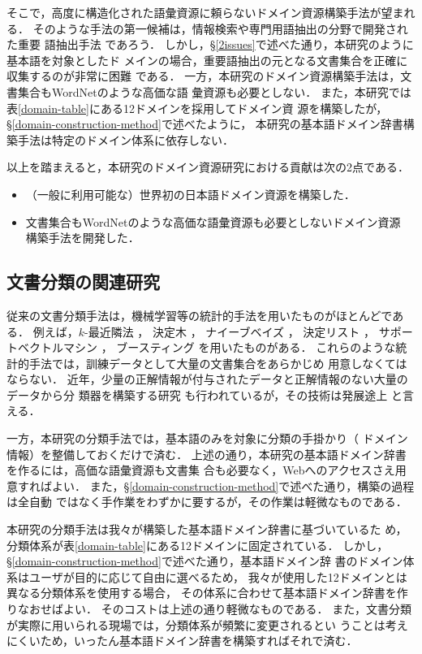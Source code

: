 \documentclass[japanese]{jnlp_1.4}
\begin{document}
そこで，高度に構造化された語彙資源に頼らないドメイン資源構築手法が望まれ
る．
そのような手法の第一候補は，情報検索や専門用語抽出の分野で開発された重要
語抽出手法
\cite{Frantzi:Ananiadou:Tsujii:1998,Hisamitsu:Tsujii:2003,中川:森:湯本:2003}
であろう．
しかし，\S\ref{2issues}で述べた通り，本研究のように基本語を対象としたド
メインの場合，重要語抽出の元となる文書集合を正確に収集するのが非常に困難
である．
一方，本研究のドメイン資源構築手法は，文書集合もWordNetのような高価な語
彙資源も必要としない．
また，本研究では表\ref{domain-table}にある12ドメインを採用してドメイン資
源を構築したが，\S\ref{domain-construction-method}で述べたように，
本研究の基本語ドメイン辞書構築手法は特定のドメイン体系に依存しない．

以上を踏まえると，本研究のドメイン資源研究における貢献は次の2点である．

\begin{itemize}
 \item （一般に利用可能な）世界初の日本語ドメイン資源を構築した．
 \item 文書集合もWordNetのような高価な語彙資源も必要としないドメイン資源
       構築手法を開発した．
\end{itemize}


\subsection{文書分類の関連研究}

従来の文書分類手法は，機械学習等の統計的手法を用いたものがほとんどである．
例えば，$k$-最近隣法 \cite{yang99evaluation}，
決定木 \cite{lewis94comparison}，
ナイーブベイズ \cite{lewis98naive}，
決定リスト \cite{li99text}，
サポートベクトルマシン \cite{平:春野:2000}，
ブースティング \cite{schapire00boostexter}を用いたものがある．
これらのような統計的手法では，訓練データとして大量の文書集合をあらかじめ
用意しなくてはならない．
近年，少量の正解情報が付与されたデータと正解情報のない大量のデータから分
類器を構築する研究 \cite{Abney:2007}も行われているが，その技術は発展途上
と言える．

一方，本研究の分類手法では，基本語のみを対象に分類の手掛かり（
ドメイン情報）を整備しておくだけで済む．
上述の通り，本研究の基本語ドメイン辞書を作るには，高価な語彙資源も文書集
合も必要なく，Webへのアクセスさえ用意すればよい．
また，\S\ref{domain-construction-method}で述べた通り，構築の過程は全自動
ではなく手作業をわずかに要するが，その作業は軽微なものである．

本研究の分類手法は我々が構築した基本語ドメイン辞書に基づいているた
め，分類体系が表\ref{domain-table}にある12ドメインに固定されている．
しかし，\S\ref{domain-construction-method}で述べた通り，基本語ドメイン辞
書のドメイン体系はユーザが目的に応じて自由に選べるため，
我々が使用した12ドメインとは異なる分類体系を使用する場合，
その体系に合わせて基本語ドメイン辞書を作りなおせばよい．
そのコストは上述の通り軽微なものである．
また，文書分類が実際に用いられる現場では，分類体系が頻繁に変更されるとい
うことは考えにくいため，いったん基本語ドメイン辞書を構築すればそれで済む．
\end{document}
